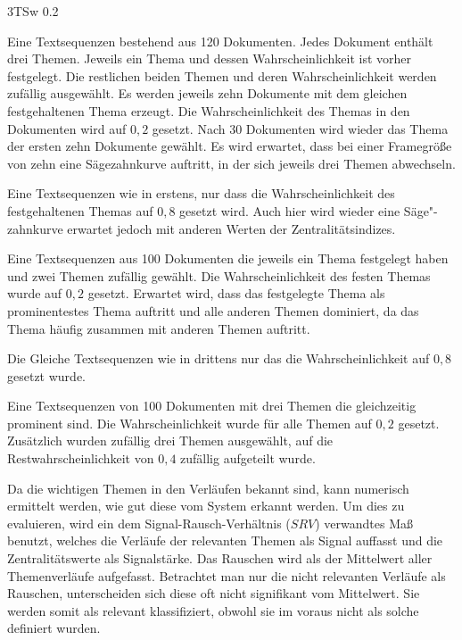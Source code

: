 \begin{labeling}[:]{3TSw 0.2}
\item[3TSw 0.2] Eine Textsequenzen bestehend aus 120 Dokumenten. Jedes Dokument enthält drei Themen. Jeweils ein Thema und dessen Wahrscheinlichkeit ist vorher festgelegt. Die restlichen beiden Themen und deren Wahrscheinlichkeit werden zufällig ausgewählt. Es werden jeweils zehn Dokumente mit dem gleichen festgehaltenen Thema erzeugt. Die Wahrscheinlichkeit des Themas in den Dokumenten wird auf $0,2$ gesetzt. Nach 30 Dokumenten wird wieder das Thema der ersten zehn Dokumente gewählt. Es wird erwartet, dass bei einer Framegröße von zehn eine Sägezahnkurve auftritt, in der sich jeweils drei Themen abwechseln.   

\item[3TSw 0.8] Eine Textsequenzen wie in erstens, nur dass die Wahrscheinlichkeit des festgehaltenen Themas auf $0,8$ gesetzt wird. Auch hier wird wieder eine Säge"-zahnkurve erwartet jedoch mit anderen Werten der Zentralitätsindizes.
 
\item[CT 0.2] Eine Textsequenzen aus 100 Dokumenten die jeweils ein Thema festgelegt haben und zwei Themen zufällig gewählt. Die Wahrscheinlichkeit des festen Themas wurde auf $0,2$ gesetzt. Erwartet wird, dass das festgelegte Thema als prominentestes Thema auftritt und alle anderen Themen dominiert, da das Thema häufig zusammen mit anderen Themen auftritt.

\item[CT 0.8] Die Gleiche Textsequenzen wie in drittens nur das die Wahrscheinlichkeit auf $0,8$ gesetzt wurde.

\item[3TS] Eine Textsequenzen von 100 Dokumenten mit drei Themen die gleichzeitig prominent sind. Die Wahrscheinlichkeit wurde für alle Themen auf $0,2$ gesetzt. Zusätzlich wurden zufällig drei Themen ausgewählt, auf die   Restwahrscheinlichkeit von $0,4$ zufällig aufgeteilt wurde.
\end{labeling}

Da die wichtigen Themen in den Verläufen bekannt sind, kann numerisch ermittelt werden, wie gut diese vom System erkannt werden. Um dies zu evaluieren, wird ein dem Signal-Rausch-Verhältnis ($SRV$) verwandtes Maß  benutzt, welches die Verläufe der relevanten Themen als Signal auffasst und die Zentralitätswerte als Signalstärke. Das Rauschen wird als der Mittelwert aller Themenverläufe aufgefasst. Betrachtet man nur die nicht relevanten Verläufe als Rauschen, unterscheiden sich diese oft nicht signifikant vom Mittelwert. Sie werden somit als relevant klassifiziert, obwohl sie im voraus nicht als solche definiert wurden. 

